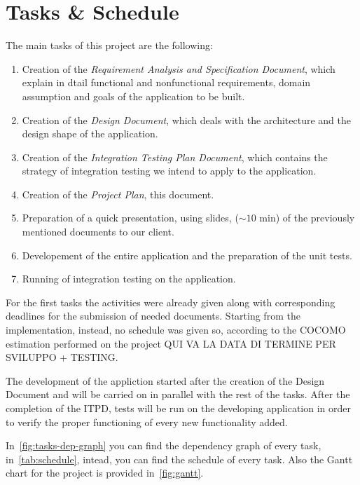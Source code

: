 \section{Tasks \& Schedule}

The main tasks of this project are the following:
\begin{enumerate}
    \item Creation of the \emph{Requirement Analysis and Specification Document}, which explain in dtail functional and nonfunctional requirements, domain assumption and goals of the application to be built.
    \item Creation of the \emph{Design Document}, which deals with the architecture and the design shape of the application.
    \item Creation of the \emph{Integration Testing Plan Document}, which contains the strategy of integration testing we intend to apply to the application.
    \item Creation of the \emph{Project Plan}, this document.
    \item Preparation of a quick presentation, using slides, ($\sim 10$ min) of the previously mentioned documents to our client.
    \item Developement of the entire application and the preparation of the unit tests.
    \item Running of integration testing on the application.
\end{enumerate}

For the first tasks the activities were already given along with corresponding deadlines for the submission of needed documents. Starting from the implementation, instead, no schedule was given so, according to the COCOMO estimation performed on the project QUI VA LA DATA DI TERMINE PER SVILUPPO + TESTING.

The development of the appliction started after the creation of the Design Document and will be carried on in parallel with the rest of the tasks.
After the completion of the ITPD, tests will be run on the developing application in order to verify the proper functioning of every new functionality added.

In~\autoref{fig:tasks-dep-graph} you can find the dependency graph of every task, in~\autoref{tab:schedule}, intead, you can find the schedule of every task. Also the Gantt chart for the project is provided in~\autoref{fig:gantt}.



